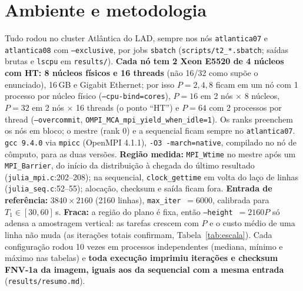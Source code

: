 \documentclass[10pt,twocolumn,a4paper]{article}
\newcommand{\code}[1]{\texttt{#1}}
\newcommand{\lref}[2]{\code{#1}:#2}
\begin{document}
\section{Ambiente e metodologia}
Tudo rodou no cluster Atlântica do LAD, sempre nos nós \code{atlantica07} e \code{atlantica08}
com \code{--exclusive}, por jobs \code{sbatch} (\code{scripts/t2\_*.sbatch}; saídas brutas e
\code{lscpu} em \code{results/}). \textbf{Cada nó tem 2 Xeon E5520 de 4 núcleos com HT: 8 núcleos
físicos e 16 threads} (não 16/32 como supõe o enunciado), 16\,GB e Gigabit Ethernet; por isso
$P=2,4,8$ ficam em um nó com 1 processo por núcleo físico (\code{--cpu-bind=cores}), $P=16$ em 2
nós $\times$ 8 núcleos, $P=32$ em 2 nós $\times$ 16 threads (o ponto ``HT'') e $P=64$ com 2
processos por thread (\code{--overcommit}, \code{OMPI\_MCA\_mpi\_yield\_when\_idle=1}). Os ranks
preenchem os nós em bloco; o mestre (rank 0) e a sequencial ficam sempre no \code{atlantica07}.
\code{gcc 9.4.0} via \code{mpicc} (OpenMPI 4.1.1), \code{-O3 -march=native}, compilado no nó de
cômputo, para as duas versões. \textbf{Região medida:} \code{MPI\_Wtime} no mestre após um
\code{MPI\_Barrier}, do início da distribuição à chegada do último resultado
(\lref{julia\_mpi.c}{202--208}); na sequencial, \code{clock\_gettime} em volta do laço de linhas
(\lref{julia\_seq.c}{52--55}); alocação, checksum e saída ficam fora. \textbf{Entrada de
referência:} $3840\times2160$ (2160 linhas), \code{max\_iter}~$=6000$, calibrada para
$T_1\in[30,60]$\,s. \textbf{Fraca:} a região do plano é fixa, então \code{--height}~$=2160P$ só
adensa a amostragem vertical: as tarefas crescem com $P$ e o custo médio de uma linha não muda (as
iterações totais confirmam, Tabela~\ref{tab:escala}). Cada configuração rodou 10 vezes em
processos independentes (mediana, mínimo e máximo nas tabelas) e \textbf{toda execução imprimiu
iterações e checksum FNV-1a da imagem, iguais aos da sequencial com a mesma entrada}
(\code{results/resumo.md}).
\end{document}
